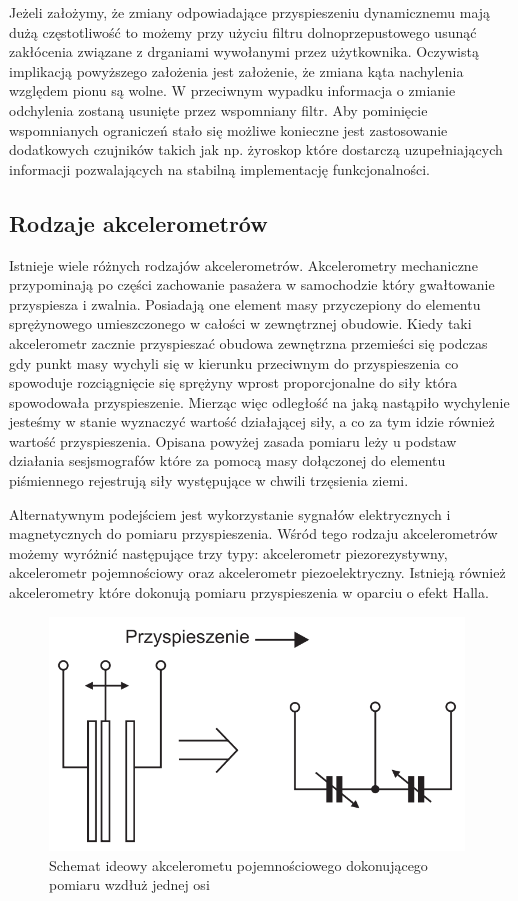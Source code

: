 Jeżeli założymy, że zmiany odpowiadające przyspieszeniu dynamicznemu mają dużą
częstotliwość to możemy przy użyciu filtru dolnoprzepustowego usunąć zakłócenia
związane z drganiami wywołanymi przez użytkownika. Oczywistą implikacją
powyższego założenia jest założenie, że zmiana kąta nachylenia względem pionu są
wolne. W przeciwnym wypadku informacja o zmianie odchylenia zostaną usunięte
przez wspomniany filtr. Aby pominięcie wspomnianych ograniczeń stało się możliwe
konieczne jest zastosowanie dodatkowych czujników takich jak np. żyroskop które
dostarczą uzupełniających informacji pozwalających na stabilną implementację
funkcjonalności.

\subsection{Rodzaje akcelerometrów}
Istnieje wiele różnych rodzajów akcelerometrów. Akcelerometry mechaniczne
przypominają po części zachowanie pasażera w samochodzie który gwałtowanie
przyspiesza i zwalnia. Posiadają one element masy przyczepiony do elementu
sprężynowego umieszczonego w całości w zewnętrznej obudowie. Kiedy taki
akcelerometr zacznie przyspieszać obudowa zewnętrzna przemieści się podczas gdy
punkt masy wychyli się w kierunku przeciwnym do przyspieszenia co spowoduje
rozciągnięcie się sprężyny wprost proporcjonalne do siły która spowodowała
przyspieszenie. Mierząc więc odległość na jaką nastąpiło wychylenie jesteśmy w
stanie wyznaczyć wartość działającej siły, a co za tym idzie również wartość
przyspieszenia. Opisana powyżej zasada pomiaru leży u podstaw działania
sesjsmografów które za pomocą masy dołączonej do elementu piśmiennego rejestrują
siły występujące w chwili trzęsienia ziemi.

Alternatywnym podejściem jest wykorzystanie sygnałów elektrycznych i
magnetycznych do pomiaru przyspieszenia. Wśród tego rodzaju akcelerometrów
możemy wyróżnić następujące trzy typy: akcelerometr piezorezystywny,
akcelerometr pojemnościowy oraz akcelerometr piezoelektryczny. Istnieją również
akcelerometry które dokonują pomiaru przyspieszenia w oparciu o efekt Halla. 

\begin{figure}[ht!]
 \centering
 \includegraphics[height=62mm]{../images/ch04/acc_intro.png}
 \caption{Schemat ideowy akcelerometu pojemnościowego dokonującego pomiaru
 wzdłuż jednej osi\cite{ElektronikaPraktyczna22010}}
 \label{fig:AkcelerometrIdeowyScheamt}
\end{figure}

